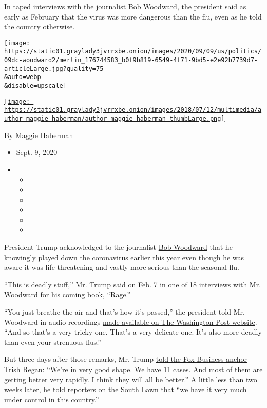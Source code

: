 In taped interviews with the journalist Bob Woodward, the president said
as early as February that the virus was more dangerous than the flu,
even as he told the country otherwise.

\texttt{[image: https://static01.graylady3jvrrxbe.onion/images/2020/09/09/us/politics/09dc-woodward2/merlin\_176744583\_b0f9b819-6549-4f71-9bd5-e2e92b7739d7-articleLarge.jpg?quality=75\\\&auto=webp\\\&disable=upscale]}

\href{https://www.nytimes3xbfgragh.onion/by/maggie-haberman}{\texttt{[image: https://static01.graylady3jvrrxbe.onion/images/2018/07/12/multimedia/author-maggie-haberman/author-maggie-haberman-thumbLarge.png]}}

By \href{https://www.nytimes3xbfgragh.onion/by/maggie-haberman}{Maggie
Haberman}

\begin{itemize}
\item
  Sept. 9, 2020
\item
  \begin{itemize}
  \item
  \item
  \item
  \item
  \item
  \item
  \end{itemize}
\end{itemize}

President Trump acknowledged to the journalist
\href{https://www.nytimes3xbfgragh.onion/2020/09/10/us/politics/trump-woodward.html}{Bob
Woodward} that he
\href{https://www.nytimes3xbfgragh.onion/interactive/2020/03/18/us/trump-coronavirus-statements-timeline.html}{knowingly
played down} the coronavirus earlier this year even though he was aware
it was life-threatening and vastly more serious than the seasonal flu.

``This is deadly stuff,'' Mr. Trump said on Feb. 7 in one of 18
interviews with Mr. Woodward for his coming book, ``Rage.''

``You just breathe the air and that's how it's passed,'' the president
told Mr. Woodward in audio recordings
\href{https://www.washingtonpost.com/politics/bob-woodward-rage-book-trump/2020/09/09/0368fe3c-efd2-11ea-b4bc-3a2098fc73d4_story.html}{made
available on The Washington Post website}. ``And so that's a very tricky
one. That's a very delicate one. It's also more deadly than even your
strenuous flus.''

But three days after those remarks, Mr. Trump
\href{https://www.youtube.com/watch?v=8IWRP9fzY74}{told the Fox Business
anchor Trish Regan}: ``We're in very good shape. We have 11 cases. And
most of them are getting better very rapidly. I think they will all be
better.'' A little less than two weeks later, he told reporters on the
South Lawn that ``we have it very much under control in this country.''

